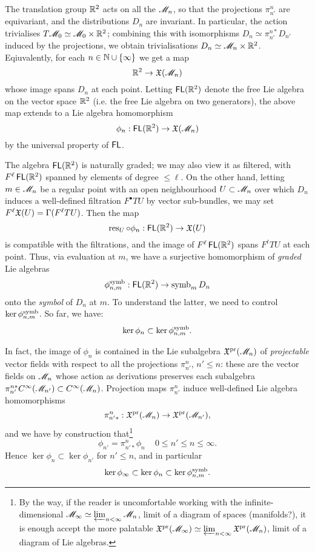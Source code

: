 The translation group ${\mathbb{R}}^2$ acts on all the $\mathscr{M}_n$, so that the projections $\pi^n_{n'}$
are equivariant, and the distributions $D_n$ are invariant. In particular, the action trivialises
$T\mathscr{M}_0 \simeq \mathscr{M}_0 \times {\mathbb{R}}^2$; combining this with isomorphisms $D_n \simeq \pi^{n*}_{n'} D_{n'}$
induced by the projections, we obtain trivialisations $D_n \simeq \mathscr{M}_n \times {\mathbb{R}}^2$. Eqiuvalently, for each 
$n \in {\mathbb{N}} \cup \{\infty\}$
we get a map
\[ {\mathbb{R}}^2 \to \mathfrak{X}(\mathscr{M}_n) \]
whose image spans $D_n$ at each point. Letting $\operatorname{\mathsf{FL}}({\mathbb{R}}^2)$ denote the free Lie algebra on the vector
space ${\mathbb{R}}^2$ (i.e. the free Lie algebra on two generators), the above map extends to a Lie algebra homomorphism
\[ \phi_n : \operatorname{\mathsf{FL}}({\mathbb{R}}^2) \to \mathfrak{X}(\mathscr{M}_n) \]
by the universal property of $\operatorname{\mathsf{FL}}$.

The algebra $\operatorname{\mathsf{FL}}({\mathbb{R}}^2)$ is naturally graded; we may also view it as filtered, with $F^\ell \operatorname{\mathsf{FL}}({\mathbb{R}}^2)$
spanned by elements of degree $\le \ell$. On the other hand, letting $m \in \mathscr{M}_n$
be a regular point with an open neighbourhood $U \subset \mathscr{M}_n$
over which $D_n$ induces a well-defined filtration $F^\bullet TU$ by vector sub-bundles,
we may set $F^\ell\mathfrak{X}(U) = \Gamma(F^\ell TU)$. Then the map
\[ \operatorname{\mathrm{res}}_U \circ \phi_n : \operatorname{\mathsf{FL}}({\mathbb{R}}^2) \to \mathfrak{X}(U) \]
is compatible with the filtrations, and the image of $F^\ell\operatorname{\mathsf{FL}}({\mathbb{R}}^2)$
spans $F^\ell TU$ at each point. Thus, via evaluation at $m$, we have a surjective  homomorphism
of \emph{graded} Lie algebras
\[ \phi_{n,m}^{\operatorname{\mathrm{symb}}} : \operatorname{\mathsf{FL}}({\mathbb{R}}^2) \to \operatorname{\mathrm{symb}}_m D_n \]
onto the \emph{symbol} of $D_n$ at $m$. 
To understand the latter, we need to control $\ker\phi_{n,m}^{\operatorname{\mathrm{symb}}}$.
So far, we have:
\[ \ker\phi_n \subset \ker \phi_{n,m}^{\operatorname{\mathrm{symb}}}.  \]

In fact, the image of $\phi_n$ is contained in the Lie subalgebra $\mathfrak{X}^{\operatorname{\mathrm{pr}}}(\mathscr{M}_n)$
of \emph{projectable} vector fields
with respect to all the projections $\pi^n_{n'}$, $n'\le n$: these are the vector fields on $\mathscr{M}_n$
whose action as derivations preserves each subalgebra $\pi^{n*}_{n'}C^\infty(\mathscr{M}_{n'}) \subset C^\infty(\mathscr{M}_n)$.
Projection maps $\pi^n_{n'}$ induce well-defined Lie algebra homomorphisms
\[ \pi^n_{n'*} : \mathfrak{X}^{\operatorname{\mathrm{pr}}}(\mathscr{M}_n) \to \mathfrak{X}^{\operatorname{\mathrm{pr}}}(\mathscr{M}_{n'}), \]
and we have by construction that\footnote{
By the way, if the reader is uncomfortable working with the infinite-dimensional
$\mathscr{M}_\infty \simeq \varprojlim_{n<\infty} \mathscr{M}_n$, limit of a diagram of spaces (manifolds?),
it is enough accept the more palatable
$\mathfrak{X}^{\operatorname{\mathrm{pr}}}(\mathscr{M}_\infty) \simeq \varprojlim_{n<\infty} \mathfrak{X}^{\operatorname{\mathrm{pr}}}(\mathscr{M}_n)$,
limit of a diagram of Lie algebras.}
\[ \phi_{n'} = \pi^n_{n'*} \phi_n\,\quad 0\le n'\le n \le \infty. \]
Hence $\ker \phi_n \subset\ker\phi_{n'}$ for $n' \le n$, and
in particular
\[ \ker\phi_\infty \subset \ker\phi_n \subset \ker\phi_{n,m}^{\operatorname{\mathrm{symb}}}. \]


